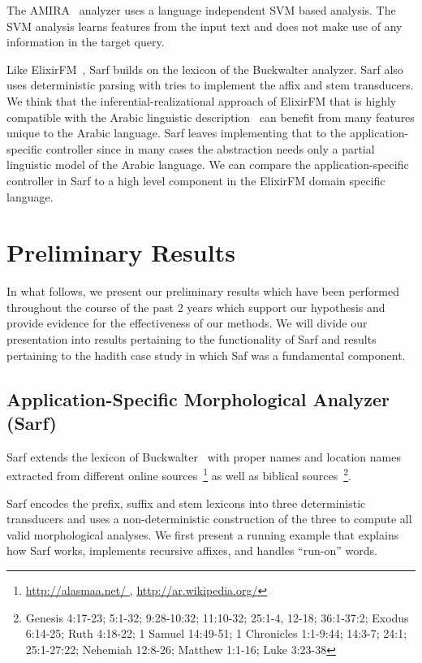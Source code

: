 \documentclass[a4,12pt]{report}
\begin{document}
The AMIRA~\cite{Diab:07} analyzer uses 
a language independent SVM based analysis. 
The SVM analysis learns features from the input text 
and does not make use of any information 
in the target query.

Like ElixirFM~\cite{Otakar:07}, Sarf builds on the lexicon
of the Buckwalter analyzer. 
Sarf also uses deterministic parsing with tries 
to implement the affix and stem transducers. 
We think that the inferential-realizational approach 
of ElixirFM
that is highly compatible with the Arabic linguistic 
description~\cite{Badawi:04}
can benefit from many features unique to the Arabic language.
Sarf leaves implementing that to the application-specific controller
since in many cases the abstraction needs only a partial 
linguistic model of the Arabic language. 
We can compare the application-specific controller in Sarf to a high level
component in the ElixirFM domain specific language. 


\chapter{Preliminary Results}

In what follows, we present our preliminary results which have been performed throughout the course of the past 2 years
which support our hypothesis and provide evidence for the effectiveness of our methods. We will divide our presentation into
results pertaining to the functionality of Sarf and results pertaining to the hadith case study in which Saf was a fundamental component.

\section{Application-Specific Morphological Analyzer (Sarf)}

Sarf extends the lexicon of Buckwalter~\cite{Buckwalter:02} with
proper names and location names extracted from different online 
sources~\footnote{\href{http://alasmaa.net/}{http://alasmaa.net/ }, 
\href{http://ar.wikipedia.org/}{http://ar.wikipedia.org/}}
as well as biblical sources~\footnote{Genesis 4:17-23; 5:1-32; 9:28-10:32; 11:10-32; 25:1-4, 12-18; 36:1-37:2; Exodus 6:14-25; Ruth 4:18-22; 1 Samuel 14:49-51; 1 Chronicles 1:1-9:44; 14:3-7; 24:1; 25:1-27:22; Nehemiah 12:8-26; Matthew 1:1-16; Luke 3:23-38}.

Sarf encodes the prefix, suffix and stem lexicons into
three deterministic transducers and 
uses a non-deterministic construction
of the three to compute all valid morphological analyses.
We first present a running example 
that 
explains how Sarf works,
implements recursive affixes, and
handles ``run-on'' words.
\end{document}
